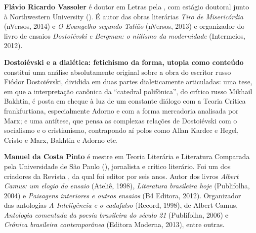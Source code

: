
\textbf{Flávio Ricardo Vassoler} é doutor em Letras pela , com estágio doutoral junto à
  Northwestern University (). É autor das obras literárias \emph{Tiro
  de Misericórdia} (nVersos, 2014) e \emph{O Evangelho segundo Talião}
  (nVersos, 2013) e organizador do livro de ensaios \emph{Dostoiévski e
  Bergman: o niilismo da modernidade} (Intermeios, 2012).

\textbf{Dostoiévski e a dialética: fetichismo da forma, utopia como conteúdo} constitui uma análise absolutamente original sobre a obra do escritor russo Fiódor Dostoiévski, dividida em duas partes dialeticamente articuladas: uma tese, em que a interpretação canônica da ``catedral polifônica'', do crítico russo Mikhail Bakhtin, é posta em cheque à luz de um constante diálogo com a Teoria Crítica frankfurtiana, especialmente Adorno e com a forma mercadoria analisada por Marx; e uma antítese, que pensa as complexas relações de Dostoiévski com o socialismo e o cristianismo, contrapondo aí polos como Allan Kardec e Hegel, Cristo e Marx, Bakhtin e Adorno etc.

\textbf{Manuel da Costa Pinto} é mestre em Teoria Literária e Literatura Comparada pela Universidade de São Paulo (), jornalista e crítico literário. Foi um dos criadores da Revista , da qual foi editor por seis anos. Autor dos livros \emph{Albert Camus: um elogio do ensaio} (Ateliê, 1998), \emph{Literatura brasileira hoje} (Publifolha, 2004) e \emph{Paisagens interiores e outros ensaios} (B4 Editora, 2012). Organizador das antologias \emph{A Inteligência e o cadafalso} (Record, 1998), de Albert Camus, \emph{Antologia comentada da poesia brasileira do século 21} (Publifolha, 2006) e \emph{Crônica brasileira contemporânea} (Editora Moderna, 2013), entre outras.







